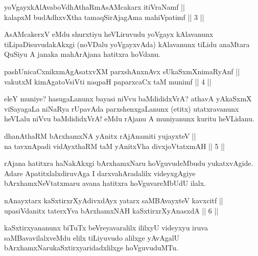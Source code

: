 \begin{shl}
yoVgayxkAlAvaboVdhAthaRmAsAMcakarx itiVraNamf || \\
kalapxM budAdhxvX\s tha tamaqSirAjagAma mahiVpatimf \hfill ||  3 ||  
\end{shl}

\begin{artha}
AsAMcakerxV eMdu shurxtiyu heVLiruvudu yoVgayx kAlavanunx tiLipaDisuvudakAkxgi (noVDalu yoVgayxvAda) kAlavanunx tiLidu anaMtara QuSiyu A janaka mahArAjana hatitxra hoVdanu.
\end{artha}


\begin{shl}
pashUnicaCxnikxmAgAsatxvXM parxshAnxnAvx sUkaSxmXnimaRyAnf || \\
vakutxM kimAgatoV\s siVti naqpaH paparxcaCx taM munimf \hfill ||  4 ||  
\end{shl}

\begin{artha}
eleY muniye? hasugaLanunx bayasi niVvu baMdididxVrA? athavA yAkaSxmX viSayagaLa niNaRya rUpavAda parxshenxgaLanunx (etitx) utatxravanunx heVLalu niVvu baMdididxVrA! eMdu rAjanu A muniyanunx kuritu heVLidanu.
\end{artha}


\begin{shl}
dhanAthaRM bArxhamxNA yAnitx rAjAnamiti yujayxteV || \\
na tavxnApadi vidAyxthaRM taM yAnitxVha divxjoVtatxmAH \hfill ||  5 ||  
\end{shl}

\begin{artha}
rAjana hatitxra haNakAkxgi bArxhamxNaru hoVguvudeMbudu yukatxvAgide. Adare ApatitxlalxdiruvAga I darxvahAradalilx videyxgAgiye bArxhamxNeVtatxmaru avana hatitxra hoVguvareMbUdU ilalx.
\end{artha}

\begin{shl}
nAnayxtarx kaSxtirxrXyAdivxdAyx yatarx saMBAvayxteV kavxcitf || \\
upasiVdanitx taterxYva bArxhamxNAH kaSxtirxrXyAnasxdA \hfill ||  6 ||  
\end{shl}

\begin{artha}
kaSxtirxyananunx biTuTx beVreyavaralilx ililxyU videyxyu iruva saMBavavilalxveMdu elilx tiLiyuvudo alilxge yAvAgalU bArxhamxNarukaSxtirxyaridadxlilxge hoVguvuduMTu.
\end{artha}

